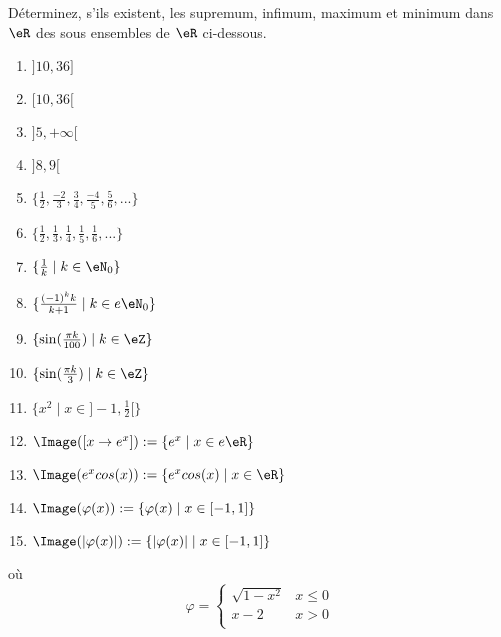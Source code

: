 
\begin{exercice}\label{exo0001}

Déterminez, s'ils existent, les supremum, infimum, maximum et minimum dans $\eR$ des sous ensembles de $\eR$ ci-dessous.
\begin{multicols}{2}
\begin{enumerate}
\item $]10,36] $
\item $[10,36[ $
\item $]5,+\infty[ $
\item $]8,9[ $
\item $\{ \frac{1}{2}, \frac{-2}{3}, \frac{3}{4}, \frac{-4}{5},  \frac{5}{6}, ... \} $
\item $\{ \frac{1}{2}, \frac{1}{3}, \frac{1}{4}, \frac{1}{5},  \frac{1}{6}, ... \} $
\item\label{itemexo1g} $\{ \frac{1}{k} \mid k \in \eN_0 \} $
\item\label{itemexo1h} $\{ \frac{(-1)^k k}{k+1} \mid k \in e\eN_0 \} $
\item $\{ \sin(\frac{\pi k}{100}) \mid k \in \eZ \} $
\item $\{ \sin(\frac{\pi k}{3}) \mid k \in \eZ \} $
\item\label{itemexo1k}  $\{ x^2 \mid x\in ]-1,\frac{1}{2} [ \} $
\item $\Image([x \rightarrow e^x]) := \{ e^x \mid x\in e\eR \}$
\item $\Image(e^x cos(x)) := \{ e^x cos(x) \mid x\in \eR \} $
\item $\Image(\varphi(x)) := \{ \varphi(x) \mid x \in [-1,1] \} $
\item $\Image( |\varphi(x)| ) := \{  |\varphi(x)| \mid x \in [-1,1] \} $
\end{enumerate}
\end{multicols}
où
\[
\varphi= \left\{ \begin{array}{ll} \sqrt{1-x^2} & x \leq 0 \\ x-2 & x>0 \\ \end{array} \right.
\]

\end{exercice}
